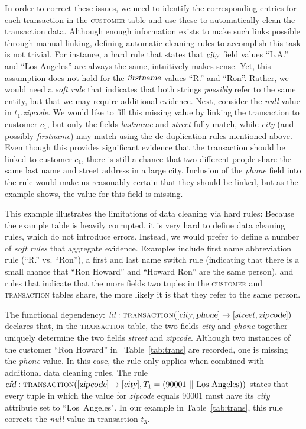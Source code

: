 
In order to correct these issues, we need to identify the corresponding entries for each transaction in the \textsc{customer} table and use these to automatically clean the transaction data. Although enough information exists to make such links possible through manual linking, defining automatic cleaning rules to accomplish this task is not trivial. For instance, a hard rule that states that $\textsl{city}$ field values ``L.A.'' and ``Los Angeles'' are always the same, intuitively makes sense. Yet, this assumption does not hold for the $\textsl{firstname}$ values ``R.'' and ``Ron''. Rather, we would need a \emph{soft rule} that indicates that both strings \emph{possibly} refer to the same entity, but that we may require additional evidence. Next, consider the \emph{null} value in $t_1.$\textsl{zipcode}. We would like to fill this missing value by linking the transaction to customer $c_1$, but only the fields \textsl{lastname} and \textsl{street} fully match, while \textsl{city} (and possibly \textsl{firstname}) may match using the de-duplication rules mentioned above. Even though this provides significant evidence that the transaction should be linked to customer $c_1$, there is still a chance that two different people share the same last name and street address in a large city. Inclusion of the \textsl{phone} field into the rule would make us reasonably certain that they should be linked, but as the example shows, the value for this field is missing. 

This example illustrates the limitations of data cleaning via hard rules: Because the example table is heavily corrupted, it is very hard to define data cleaning rules, which do not introduce errors. Instead, we would prefer to define a number of \emph{soft rules} that aggregate evidence. Examples include first name abbreviation rule (``R.'' vs. ``Ron''), a first and last name switch rule (indicating that there is a small chance that ``Ron Howard'' and ``Howard Ron'' are the same person), and rules that indicate that the more fields two tuples in the \textsc{customer} and \textsc{transaction} tables share, the more likely it is that they refer to the same person. 

The functional dependency: $\textsl{fd}: \textsc{transaction}([\textsl{city}, \textsl{phone}] \rightarrow [\textsl{street}, \textsl{zipcode}])$ declares that, in the \textsc{transaction} table, the two fields \textsl{city} and \textsl{phone} together 
uniquely determine the two fields \textsl{street} and \textsl{zipcode}. Although two instances of the customer ``Ron Howard'' in ~Table~\ref{tab:trans} are recorded, one is missing the \textsl{phone} value. In this case, the rule only applies when combined with additional data cleaning rules. The rule $\textsl{cfd}: \textsc{transaction}([\textsl{zipcode}] \rightarrow [\textsl{city}], T_1 =(90001~||~\text{Los~Angeles}))$ states that every tuple in which the value for \textsl{zipcode} equals $90001$ must have its \textsl{city} attribute set to ``Los~Angeles". In our example in Table~\ref{tab:trans}, this rule corrects the \emph{null} value in transaction $t_3$. 

